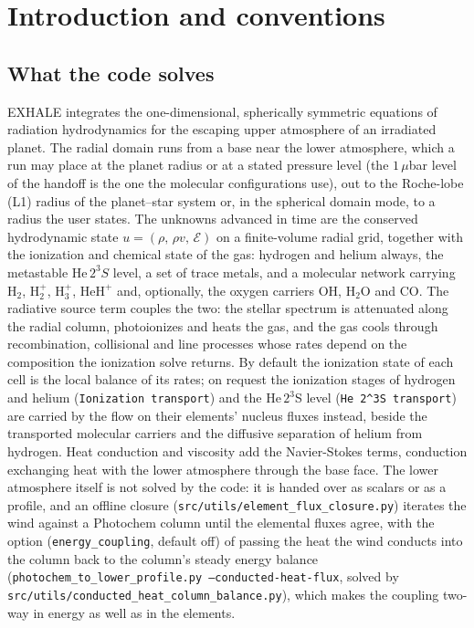 \section{Introduction and conventions}
\label{sec:intro}

\subsection{What the code solves}
\label{sec:intro:what}

EXHALE integrates the one-dimensional, spherically symmetric equations of
radiation hydrodynamics for the escaping upper atmosphere of an irradiated
planet.  The radial domain runs from a base near the lower atmosphere, which
a run may place at the planet radius or at a stated pressure level (the
$1\,\mu$bar level of the \citet{Koskinen2022} handoff is the one the molecular
configurations use), out to the Roche-lobe (L1) radius of the planet--star
system or, in the spherical domain mode, to a radius the user states.  The
unknowns advanced in time are the conserved hydrodynamic state
$u = (\rho,\,\rho v,\,\mathcal{E})$ on a finite-volume radial grid, together with the
ionization and chemical state of the gas: hydrogen and helium always, the
metastable $\mathrm{He}\,2^3S$ level, a set of trace metals, and a molecular
network carrying $\mathrm{H}_2$, $\mathrm{H}_2^+$, $\mathrm{H}_3^+$,
$\mathrm{HeH}^+$ and, optionally, the oxygen carriers OH, $\mathrm{H_2O}$ and
CO.  The radiative source term couples the two: the stellar spectrum is
attenuated along the radial column, photoionizes and heats the gas, and the
gas cools through recombination, collisional and line processes whose rates
depend on the composition the ionization solve returns.  By default the
ionization state of each cell is the local balance of its rates; on request
the ionization stages of hydrogen and helium (\texttt{Ionization transport})
and the He\,$2^3$S level (\texttt{He 2\^{}3S transport}) are carried by the
flow on their elements' nucleus fluxes instead, beside the transported
molecular carriers and the diffusive separation of helium from hydrogen.
Heat conduction and viscosity add the Navier-Stokes terms, conduction
exchanging heat with the lower atmosphere through the base face.  The lower
atmosphere itself is not solved by the code: it is handed over as scalars or
as a profile, and an offline closure (\texttt{src/utils/element\_flux\_closure.py})
iterates the wind against a Photochem column until the elemental fluxes agree,
with the option (\texttt{energy\_coupling}, default off) of passing the heat
the wind conducts into the column back to the column's steady energy balance
(\texttt{photochem\_to\_lower\_profile.py --conducted-heat-flux}, solved by
\texttt{src/utils/conducted\_heat\_column\_balance.py}), which makes the
coupling two-way in energy as well as in the elements.


